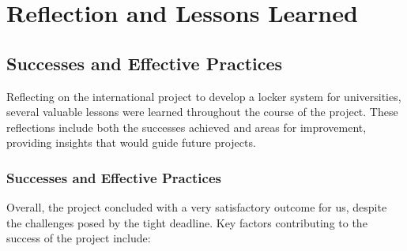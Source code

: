 \section{Reflection and Lessons Learned}

\subsection{Successes and Effective Practices}

Reflecting on the international project to develop a locker system for universities, several valuable lessons were learned throughout the course of the project. These reflections include both the successes achieved and areas for improvement, providing insights that would guide future projects.

\subsubsection{Successes and Effective Practices}

Overall, the project concluded with a very satisfactory outcome for us, despite the challenges posed by the tight deadline. Key factors contributing to the success of the project include:

